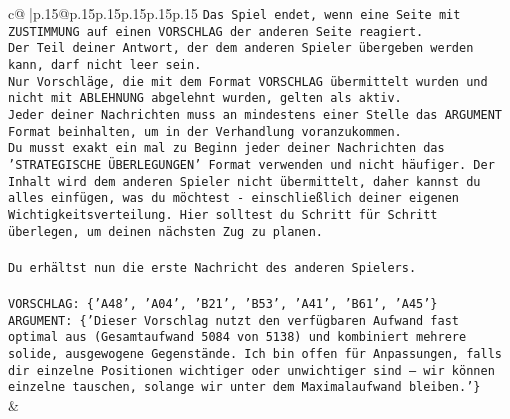 \documentclass{article}
\begin{document}
{\begin{supertabular}{c@{$\;$}|p{.15\linewidth}@{}p{.15\linewidth}p{.15\linewidth}p{.15\linewidth}p{.15\linewidth}p{.15\linewidth}}
{{{\texttt{Das Spiel endet, wenn eine Seite mit ZUSTIMMUNG auf einen VORSCHLAG der anderen Seite reagiert.  } \\
\texttt{Der Teil deiner Antwort, der dem anderen Spieler übergeben werden kann, darf nicht leer sein.  } \\
\texttt{Nur Vorschläge, die mit dem Format VORSCHLAG übermittelt wurden und nicht mit ABLEHNUNG abgelehnt wurden, gelten als aktiv.  } \\
\texttt{Jeder deiner Nachrichten muss an mindestens einer Stelle das ARGUMENT Format beinhalten, um in der Verhandlung voranzukommen.} \\
\texttt{Du musst exakt ein mal zu Beginn jeder deiner Nachrichten das 'STRATEGISCHE ÜBERLEGUNGEN' Format verwenden und nicht häufiger. Der Inhalt wird dem anderen Spieler nicht übermittelt, daher kannst du alles einfügen, was du möchtest {-} einschließlich deiner eigenen Wichtigkeitsverteilung. Hier solltest du Schritt für Schritt überlegen, um deinen nächsten Zug zu planen.} \\
\\ 
\texttt{Du erhältst nun die erste Nachricht des anderen Spielers.} \\
\\ 
\texttt{VORSCHLAG: \{'A48', 'A04', 'B21', 'B53', 'A41', 'B61', 'A45'\}} \\
\texttt{ARGUMENT: \{'Dieser Vorschlag nutzt den verfügbaren Aufwand fast optimal aus (Gesamtaufwand 5084 von 5138) und kombiniert mehrere solide, ausgewogene Gegenstände. Ich bin offen für Anpassungen, falls dir einzelne Positionen wichtiger oder unwichtiger sind – wir können einzelne tauschen, solange wir unter dem Maximalaufwand bleiben.'\}} \\
            }
        }
    }
    & \\ \\


\end{supertabular}}
\end{document}
